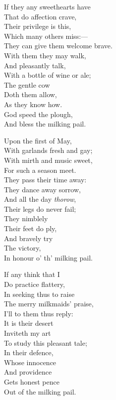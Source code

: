 \begin{dcverse}

\begin{patverse}
If they any sweethearts have\\
That do affection crave,\\
Their privilege is this,\\
Which many others miss:—\\
They can give them welcome brave.\\
With them they may walk,\\
And pleasantly talk,\\
With a bottle of wine or ale;\\
The gentle cow\\
Doth them allow,\\
As they know how.\\
God speed the plough,\\
And bless the milking pail.
\end{patverse}


\begin{patverse}
Upon the first of May,\\
With garlands fresh and gay;\\
With mirth and music sweet,\\
For such a season meet.\\
They pass their time away:\\
They dance away sorrow,\\
And all the day \textit{thorow},\\
Their legs do never fail;\\
They nimblely\\
Their feet do ply,\\
And bravely try\\
The victory,\\
In honour o’ th’ milking pail.
\end{patverse}

\begin{patverse}
If any think that I\\
Do practice flattery,\\
In seeking thus to raise\\
The merry milkmaids’ praise,\\
I’ll to them thus reply:\\
It is their desert\\
Inviteth my art\\
To study this pleasant tale;\\
In their defence,\\
Whose innocence\\
And providence\\
Gets honest pence\\
Out of the milking pail.
\end{patverse}
\end{dcverse}

